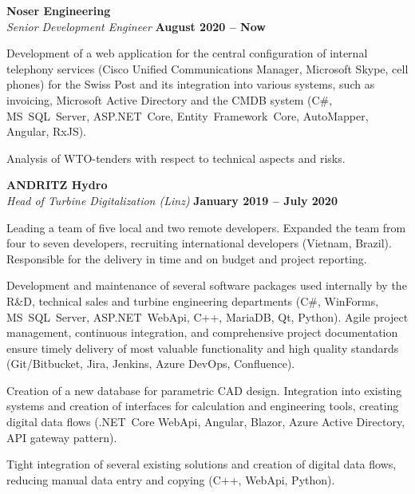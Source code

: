 \documentclass[line,11pt,a4paper]{resume}
\begin{document}
\begin{resume}
\textbf{Noser Engineering}\\\vspace{1mm}%
\textsl{Senior Development Engineer}
  \hfill \textbf{August 2020 -- Now}\\
\vspace{-4mm}%
\begin{list2}
  \item Development of a web application for the central configuration of
    internal telephony services (Cisco Unified Communications Manager,
    Microsoft Skype, cell phones) for the Swiss Post and its integration into
    various systems, such as invoicing, Microsoft Active Directory and the
    CMDB system (C\#, MS~SQL~Server, ASP.NET~Core, Entity~Framework~Core,
    AutoMapper, Angular, RxJS).
  \item Analysis of WTO-tenders with respect to technical aspects and risks.
\end{list2}

\textbf{ANDRITZ Hydro}\\\vspace{1mm}%
\textsl{Head of Turbine Digitalization (Linz)}
  \hfill \textbf{January 2019 -- July 2020}\\
\vspace{-4mm}%
\begin{list2}
  \item Leading a team of five local and two remote developers. Expanded the
    team from four to seven developers, recruiting international developers
    (Vietnam, Brazil). Responsible for the delivery in time and on budget and
    project reporting.
  \item Development and maintenance of several software packages used
    internally by the R\&D, technical sales and turbine engineering
    departments (C\#, WinForms, MS~SQL~Server, ASP.NET~WebApi, C++, MariaDB,
    Qt, Python). Agile project management, continuous integration, and
    comprehensive project documentation ensure timely delivery of most valuable
    functionality and high quality standards (Git/Bitbucket, Jira, Jenkins,
    Azure DevOps, Confluence).
  \item Creation of a new database for parametric CAD design. Integration into
    existing systems and creation of interfaces for calculation and engineering
    tools, creating digital data flows (.NET~Core WebApi, Angular, Blazor,
    Azure Active Directory, API gateway pattern).
  \item Tight integration of several existing solutions and creation of digital
    data flows, reducing manual data entry and copying (C++, WebApi, Python).
\end{list2}


\end{resume}
\end{document}
